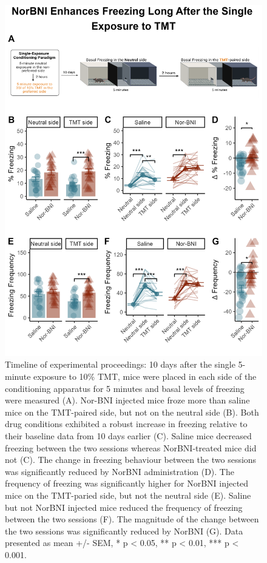 \documentclass[
]{book}
\begin{document}
\begin{figure}
\includegraphics[width=22.92in]{Panels/Long_Panel} \caption{Timeline of experimental proceedings: 10 days after the single 5-minute exposure to 10\% TMT, mice were placed in each side of the conditioning apparatus for 5 minutes and basal levels of freezing were measured (A). Nor-BNI injected mice froze more than saline mice on the TMT-paired side, but not on the neutral side (B). Both drug conditions exhibited a robust increase in freezing relative to their baseline data from 10 days earlier (C). Saline mice decreased freezing between the two sessions whereas NorBNI-treated mice did not (C). The change in freezing behaviour between the two sessions was significantly reduced by NorBNI administration (D). The frequency of freezing was significantly higher for NorBNI injected mice on the TMT-paried side, but not the neutral side (E). Saline but not NorBNI injected mice reduced the frequency of freezing between the two sessions (F). The magnitude of the change between the two sessions was significantly reduced by NorBNI (G). Data presented as mean +/- SEM, * p < 0.05, ** p < 0.01, *** p < 0.001. }\label{fig:unnamed-chunk-58}
\end{figure}
\end{document}

